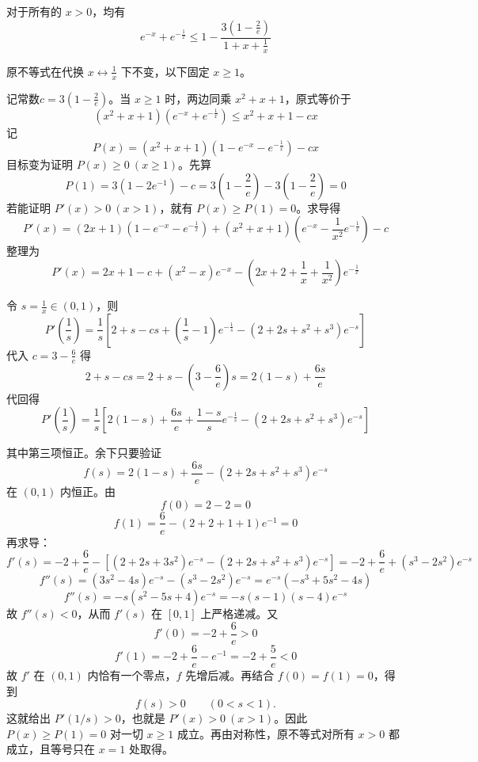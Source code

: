 \begin{example}[虚调子]
    对于所有的 $x > 0$，均有
$$e^{-x} + e^{-\frac{1}{x}} \leq 1 - \frac{3\left(1 - \frac{2}{e}\right)}{1 + x + \frac{1}{x}}$$
\end{example}
\begin{solution}
原不等式在代换 $x \leftrightarrow \frac{1}{x}$ 下不变，以下固定 $x \ge 1$。

记常数$c = 3\left(1 - \frac{2}{e}\right)$。当 $x\ge1$ 时，两边同乘 $x^2+x+1$，原式等价于
$$(x^2+x+1)\left(e^{-x} + e^{-\frac{1}{x}}\right) \leq x^2+x+1 - cx$$
记
$$P(x) = (x^2+x+1)\left(1 - e^{-x} - e^{-\frac{1}{x}}\right) - cx$$
目标变为证明 $P(x)\ge0\ (x\ge1)$。先算
$$P(1) = 3(1 - 2e^{-1}) - c = 3\left(1 - \frac{2}{e}\right) - 3\left(1 - \frac{2}{e}\right) = 0$$
若能证明 $P'(x)>0\ (x>1)$，就有 $P(x)\ge P(1)=0$。求导得
$$P'(x) = (2x+1)\left(1 - e^{-x} - e^{-\frac{1}{x}}\right) + (x^2+x+1)\left(e^{-x} - \frac{1}{x^2}e^{-\frac{1}{x}}\right) - c$$
整理为
$$P'(x) = 2x+1 - c + (x^2-x)e^{-x} - \left(2x+2+\frac{1}{x}+\frac{1}{x^2}\right)e^{-\frac{1}{x}}$$

令 $s=\frac1x\in(0,1)$，则
$$P'\left(\frac{1}{s}\right) = \frac{1}{s} \left[ 2 + s - cs + \left(\frac{1}{s} - 1\right)e^{-\frac{1}{s}} - (2+2s+s^2+s^3)e^{-s} \right]$$
代入 $c = 3 - \frac{6}{e}$ 得
$$2 + s - cs = 2 + s - \left(3 - \frac{6}{e}\right)s = 2(1-s) + \frac{6s}{e}$$
代回得
$$P'\left(\frac{1}{s}\right) = \frac{1}{s} \left[ 2(1-s) + \frac{6s}{e} + \frac{1-s}{s}e^{-\frac{1}{s}} - (2+2s+s^2+s^3)e^{-s} \right]$$

其中第三项恒正。余下只要验证
$$f(s) = 2(1-s) + \frac{6s}{e} - (2+2s+s^2+s^3)e^{-s}$$
在 $(0,1)$ 内恒正。由
$$f(0) = 2 - 2 = 0$$
$$f(1) = \frac{6}{e} - (2+2+1+1)e^{-1} = 0$$
再求导：
$$f'(s) = -2 + \frac{6}{e} - \left[ (2+2s+3s^2)e^{-s} - (2+2s+s^2+s^3)e^{-s} \right] = -2 + \frac{6}{e} + (s^3 - 2s^2)e^{-s}$$
$$f''(s) = (3s^2 - 4s)e^{-s} - (s^3 - 2s^2)e^{-s} = e^{-s} (-s^3 + 5s^2 - 4s)$$
$$f''(s) = -s(s^2 - 5s + 4)e^{-s} = -s(s-1)(s-4)e^{-s}$$
故 $f''(s)<0$，从而 $f'(s)$ 在 $[0,1]$ 上严格递减。又
$$f'(0) = -2 + \frac{6}{e} > 0$$
$$f'(1) = -2 + \frac{6}{e} - e^{-1} = -2 + \frac{5}{e} < 0$$
故 $f'$ 在 $(0,1)$ 内恰有一个零点，$f$ 先增后减。再结合 $f(0)=f(1)=0$，得到
\[
f(s)>0\qquad (0<s<1).
\]
这就给出 $P'(1/s)>0$，也就是 $P'(x)>0\ (x>1)$。因此 $P(x)\ge P(1)=0$ 对一切 $x\ge1$ 成立。再由对称性，原不等式对所有 $x>0$ 都成立，且等号只在 $x=1$ 处取得。
\end{solution}


